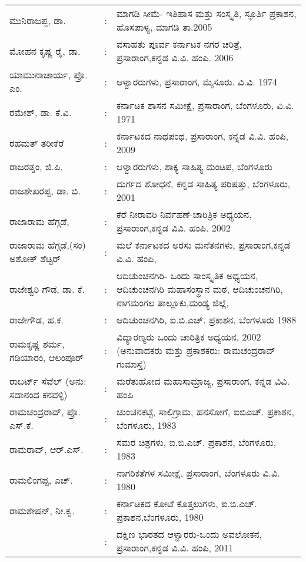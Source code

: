 \begin{longtable}[l]{@{}>{\raggedright}p{4.7cm}cp{9.2cm}<{\raggedright}@{}}
ಮುನಿರಾಜಪ್ಪ, ಡಾ. & : &  ಮಾಗಡಿ ಸೀಮೆ- ಇತಿಹಾಸ ಮತ್ತು ಸಂಸ್ಕೃತಿ, ಸ್ಫೂರ್ತಿ ಪ್ರಕಾಶನ, ಹೊಸಪಾಳ್ಯ, ಮಾಗಡಿ ತಾ.2005\\
ಮೋಹನ ಕೃಷ್ಣ ರೈ, ಡಾ. & : &  ವಸಾಹತು ಪೂರ್ವ ಕರ್ನಾಟಕ ನಗರ ಚರಿತ್ರೆ, ಪ್ರಸಾರಾಂಗ,\newline ಕನ್ನಡ ವಿ.ವಿ. ಹಂಪಿ. 2006\\
ಯಾಮುನಾಚಾರ್ಯ, ಪ್ರೊ. ಎಂ. & : & ಆಳ್ವಾರರುಗಳು, ಪ್ರಸಾರಾಂಗ, ಮೈಸೂರು. ವಿ.ವಿ. 1974\\
ರಮೇಶ್​, ಡಾ. ಕೆ.ವಿ. & : &  ಕರ್ನಾಟಕ ಶಾಸನ ಸಮೀಕ್ಷೆ, ಪ್ರಸಾರಾಂಗ, ಬೆಂಗಳೂರು, ವಿ.ವಿ. 1971\\
ರಹಮತ್​ ತರೀಕೆರೆ & : & ಕರ್ನಾಟಕದ ನಾಥಪಂಥ, ಪ್ರಸಾರಾಂಗ, ಕನ್ನಡ ವಿ.ವಿ. ಹಂಪಿ, 2009\\
ರಾಜರತ್ನಂ, ಜಿ.ಪಿ. & : & ಆಳ್ವಾರರುಗಳು, ಶಾಕ್ಯ ಸಾಹಿತ್ಯ ಮಂಟಪ, ಬೆಂಗಳೂರು\\
ರಾಜಶೇಖರಪ್ಪ, ಡಾ. ಬಿ. & : &  ದುರ್ಗದ ಶೋಧನೆ, ಕನ್ನಡ ಸಾಹಿತ್ಯ ಪರಿಷತ್ತು, ಬೆಂಗಳೂರು, 2001\\
ರಾಜಾರಾಮ ಹೆಗ್ಗಡೆ, & : &  ಕೆರೆ ನೀರಾವರಿ ನಿರ್ವಹಣೆ-ಚಾರಿತ್ರಿಕ ಅಧ್ಯಯನ, ಪ್ರಸಾರಾಂಗ,\newline ಕನ್ನಡ ವಿವಿ. ಹಂಪಿ. 2002\\
ರಾಜಾರಾಮ ಹೆಗ್ಗಡೆ,(ಸಂ) ಅಶೋಕ್​ ಶೆಟ್ಟರ್​ & : &  ಮಲೆ ಕರ್ನಾಟಕದ ಅರಸು ಮನೆತನಗಳು, ಪ್ರಸಾರಾಂಗ,\newline ಕನ್ನಡ ವಿ.ವಿ. ಹಂಪಿ,\\
ರಾಜೇಶ್ವರಿ ಗೌಡ, ಡಾ. ಕೆ. & : &  ಆದಿಚುಂಚನಗಿರಿ- ಒಂದು ಸಾಂಸ್ಕೃತಿಕ ಅಧ್ಯಯನ, ಆದಿಚುಂಚನಗಿರಿ ಮಹಾಸಂಸ್ಥಾನ ಮಠ, ಆದಿಚುಂಚನಗಿರಿ, ನಾಗಮಂಗಲ ತಾಲ್ಲೂಕು,\newline ಮಂಡ್ಯ ಜಿಲ್ಲೆ,\\
ರಾಜೇಗೌಡ, ಹ.ಕ. & : &  ಆದಿಚುಂಚನಗಿರಿ, ಐ.ಬಿ.ಎಚ್​. ಪ್ರಕಾಶನ, ಬೆಂಗಳೂರು 1988\\
ರಾಮಕೃಷ್ಣ ಶರ್ಮ, ಗಡಿಯಾರಂ, ಆಲಂಪೂರ್​ & : &  ವಿದ್ಯಾರಣ್ಯರು ಒಂದು ಚಾರಿತ್ರಿಕ ಅಧ್ಯಯನ, 2002 (ಅನುವಾದಕರು ಮತ್ತು ಪ್ರಕಾಶಕರು: ರಾಮಚಂದ್ರರಾವ್​ ಗುಮಾಸ್ತೆ)\\
ರಾಬರ್ಟ್ ಸೆವೆಲ್​ (ಅನು: ಸದಾನಂದ ಕನವಳ್ಳಿ) & : & ಮರೆತುಹೋದ ಮಹಾಸಾಮ್ರಾಜ್ಯ, ಪ್ರಸಾರಾಂಗ, ಕನ್ನಡ ವಿವಿ. ಹಂಪಿ\\
ರಾಮಚಂದ್ರರಾವ್​, ಪ್ರೊ. ಎಸ್​.ಕೆ. & : & ಚುಂಚನಕಟ್ಟೆ, ಸಾಲಿಗ್ರಾಮ, ಹನಸೋಗೆ, ಐಬಿಎಚ್​. ಪ್ರಕಾಶನ, ಬೆಂಗಳೂರು, 1983\\
ರಾಮರಾವ್​, ಆರ್​.ಎಸ್​. & : & ಸಮರ ಚಿತ್ರಗಳು, ಐ.ಬಿ.ಎಚ್​. ಪ್ರಕಾಶನ, ಬೆಂಗಳೂರು, 1983\\
ರಾಮಲಿಂಗಪ್ಪ, ಎಚ್​. & : & ನಾಗರಿಕತೆಗಳ ಸಮೀಕ್ಷೆ, ಪ್ರಸಾರಾಂಗ, ಬೆಂಗಳೂರು ವಿ.ವಿ. 1980\\
ರಾಮಶೇಷನ್​, ನೀ.ಕೃ. & : & ಕರ್ನಾಟಕದ ಕೋಟೆ ಕೊತ್ತಲುಗಳು, ಐ.ಬಿ.ಎಚ್​. ಪ್ರಕಾಶನ,\newline ಬೆಂಗಳೂರು, 1980\\
& : & ದಕ್ಷಿಣ ಭಾರತದ ಆಳ್ವಾರರು-ಒಂದು ಅವಲೋಕನ, ಪ್ರಸಾರಾಂಗ,\newline ಕನ್ನಡ ವಿ.ವಿ. ಹಂಪಿ, 2011\\

\end{longtable}
